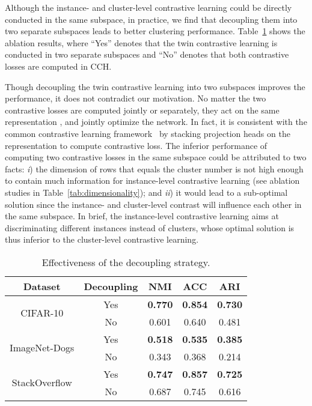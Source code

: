 Although the instance- and cluster-level contrastive learning could be directly conducted in the same subspace, in practice, we find that decoupling them into two separate subspaces leads to better clustering performance. Table~\ref{tab:decouple} shows the ablation results, where ``Yes'' denotes that the twin contrastive learning is conducted in two separate subspaces and ``No'' denotes that both contrastive losses are computed in CCH.

Though decoupling the twin contrastive learning into two subspaces improves the performance, it does not contradict our motivation. No matter the two contrastive losses are computed jointly or separately, they act on the same representation , and jointly optimize the network. In fact, it is consistent with the common contrastive learning framework~\citep{SimCLR, MOCO} by stacking projection heads on the representation to compute contrastive loss. The inferior performance of computing two contrastive losses in the same subspace could be attributed to two facts: \textit{i}) the dimension of rows that equals the cluster number is not high enough to contain much information for instance-level contrastive learning (see ablation studies in Table~\ref{tab:dimensionality}); and \textit{ii}) it would lead to a sub-optimal solution since the instance- and cluster-level contrast will influence each other in the same subspace. In brief, the instance-level contrastive learning aims at discriminating different instances instead of clusters, whose optimal solution is thus inferior to the cluster-level contrastive learning.

\begin{table}[!h]
\centering
\caption{Effectiveness of the decoupling strategy.}
\begin{tabular}{@{}ccccc@{}}
\toprule
Dataset                      & Decoupling & NMI & ACC & ARI \\ \midrule
\multirow{2}{*}{CIFAR-10}    & Yes       &   \textbf{0.770}     &     \textbf{0.854}      & \textbf{0.730}    \\
                             & No        &   0.601     &     0.640      & 0.481   \\ \midrule
\multirow{2}{*}{ImageNet-Dogs} & Yes        &   \textbf{0.518}     &     \textbf{0.535}      & \textbf{0.385}\\
                             & No         &   0.343     &     0.368      & 0.214     \\\midrule
\multirow{2}{*}{StackOverflow} & Yes        &   \textbf{0.747}        &  \textbf{0.857}         &    \textbf{0.725} \\
                             & No         &  0.687   &  0.745   &  0.616   \\ \bottomrule
\end{tabular}
\label{tab:decouple}
\end{table}

